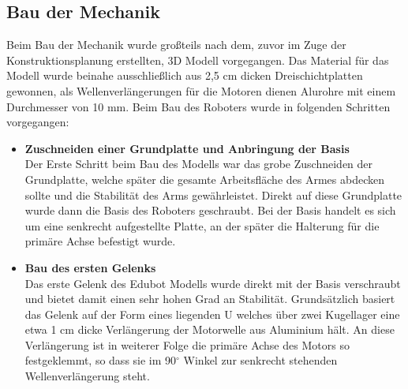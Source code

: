 \subsection{Bau der Mechanik}
Beim Bau der Mechanik wurde großteils nach dem, zuvor im Zuge der Konstruktionsplanung erstellten, 3D Modell vorgegangen. Das Material für das Modell wurde beinahe ausschließlich aus 2,5 cm dicken Dreischichtplatten gewonnen, als Wellenverlängerungen für die Motoren dienen Alurohre mit einem Durchmesser von 10 mm. 
Beim Bau des Roboters wurde in folgenden Schritten vorgegangen:
\begin{itemize}
\item \textbf{Zuschneiden einer Grundplatte und Anbringung der Basis}\\
Der Erste Schritt beim Bau des Modells war das grobe Zuschneiden der Grundplatte, welche später die gesamte Arbeitsfläche des Armes abdecken sollte und die Stabilität des Arms gewährleistet.
Direkt auf diese Grundplatte wurde dann die Basis des Roboters geschraubt. Bei der Basis handelt es sich um eine senkrecht aufgestellte Platte, an der später die Halterung für die primäre Achse befestigt wurde.

\item \textbf{Bau des ersten Gelenks}\\
Das erste Gelenk des  Edubot Modells wurde direkt mit der Basis verschraubt und bietet damit einen sehr hohen Grad an Stabilität. Grundsätzlich basiert das Gelenk auf der Form eines liegenden U welches über zwei Kugellager eine etwa 1 cm dicke Verlängerung der Motorwelle aus Aluminium hält. An diese Verlängerung ist in weiterer Folge die primäre Achse des Motors so festgeklemmt, so dass sie im 90$^\circ$ Winkel zur senkrecht stehenden Wellenverlängerung steht.


\end{itemize}
